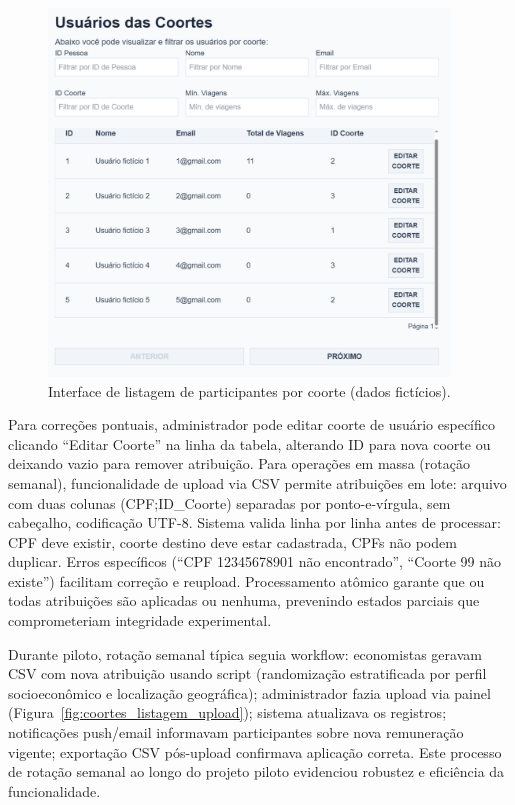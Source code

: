  \begin{figure}[H]
    \centering
    \includegraphics[width=0.95\textwidth]{figuras/usuario_coortes_zoom.PNG}
    \caption{Interface de listagem de participantes por coorte (dados fictícios).}
    \label{fig:coortes_listagem_usuarios}
  \end{figure}

Para correções pontuais, administrador pode editar coorte de usuário específico clicando ``Editar Coorte'' na linha da tabela, alterando ID para nova coorte ou deixando vazio para remover atribuição. Para operações em massa (rotação semanal), funcionalidade de upload via CSV permite atribuições em lote: arquivo com duas colunas (CPF;ID\_Coorte) separadas por ponto-e-vírgula, sem cabeçalho, codificação UTF-8. Sistema valida linha por linha antes de processar: CPF deve existir, coorte destino deve estar cadastrada, CPFs não podem duplicar. Erros específicos (``CPF 12345678901 não encontrado'', ``Coorte 99 não existe'') facilitam correção e reupload. Processamento atômico garante que ou todas atribuições são aplicadas ou nenhuma, prevenindo estados parciais que comprometeriam integridade experimental.

Durante piloto, rotação semanal típica seguia workflow: economistas geravam CSV com nova atribuição usando script (randomização estratificada por perfil socioeconômico e localização geográfica); administrador fazia upload via painel (Figura~\ref{fig:coortes_listagem_upload}); sistema atualizava os registros; notificações push/email informavam participantes sobre nova remuneração vigente; exportação CSV pós-upload confirmava aplicação correta. Este processo de rotação semanal ao longo do projeto piloto evidenciou robustez e eficiência da funcionalidade.

